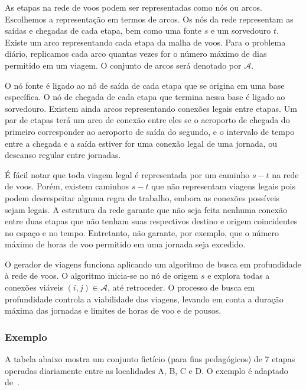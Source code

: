 \documentclass[12pt,a4paper]{article}
\newcommand{\calA}{\mathcal{A}}
\begin{document}
As etapas na rede de voos podem ser representadas como nós ou arcos. Escolhemos a representação em
termos de arcos. Os nós da rede representam as saídas e chegadas de cada etapa, bem como uma fonte
$s$ e um sorvedouro $t$. Existe um arco representando cada etapa da malha de voos. Para o problema
diário, replicamos cada arco quantas vezes for o número máximo de dias permitido em um viagem. O
conjunto de arcos será denotado por $\calA$.

O nó fonte é ligado ao nó de saída de cada etapa que se origina em uma base específica. O nó de
chegada de cada etapa que termina nessa base é ligado ao sorvedouro. Existem ainda arcos
representando conexões legais entre etapas. Um par de etapas terá um arco de conexão entre eles se
o aeroporto de chegada do primeiro corresponder ao aeroporto de saída do segundo, e o intervalo de
tempo entre a chegada e a saída estiver for uma conexão legal de uma jornada, 
ou descanso regular entre jornadas. 

É fácil notar que toda viagem legal é representada por um caminho $s-t$ na rede de voos. Porém,
existem caminhos $s-t$ que não representam viagens legais pois podem desrespeitar alguma regra de
trabalho, embora as conexões possíveis sejam legais. A estrutura da rede garante que não seja feita
nenhuma conexão entre duas etapas que não tenham suas respectivos destino e origem coincidentes no
espaço e no tempo. Entretanto, não garante, por exemplo, que o número máximo de horas de voo
permitido em uma jornada seja excedido. 

O gerador de viagens funciona aplicando um algoritmo de busca em profundidade à rede de voos. O
algoritmo inicia-se no nó de origem $s$ e explora todas a conexões viáveis $(i, j) \in \calA$, até
retroceder. O processo de busca em profundidade controla a viabilidade das viagens, levando em conta
a duração máxima das jornadas e limites de horas de voo e de pousos.


\subsubsection{Exemplo}
\label{sec:exemplo}

A tabela abaixo mostra um conjunto fictício (para fins pedagógicos) de 7 etapas operadas diariamente 
entre as localidades A, B, C e D. O exemplo é adaptado de~\cite{barnhart03}. 
\end{document}
